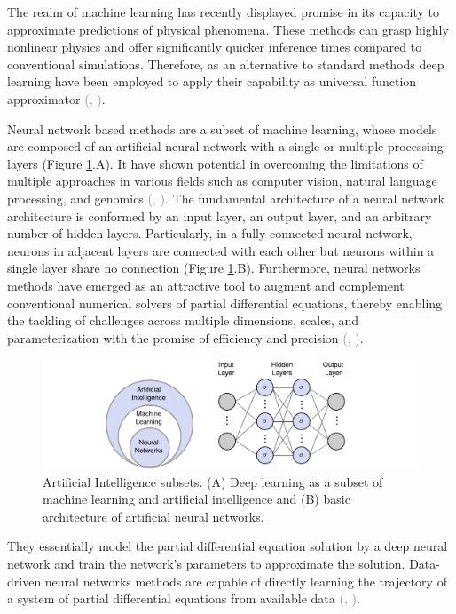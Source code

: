 \documentclass[11pt,twoside]{article}
\renewcommand{\citep}[2][]{\textcolor{gray}{(\citeauthor{#2}, \citeyear[#1]{#2})}}
\begin{document}
The realm of machine learning has recently displayed promise in its capacity to approximate predictions of physical phenomena. These methods can grasp highly nonlinear physics and offer significantly quicker inference times compared to conventional simulations. Therefore, as an alternative to standard methods deep learning have been employed to apply their capability as universal function approximator \citep{hornik_approximation_1991}.

Neural network based methods are a subset of machine learning, whose models are composed of an artificial neural network with a single or multiple processing layers (Figure \ref{deep_learning_subset_architecture}.A). It have shown potential in overcoming the limitations of multiple approaches in various fields such as computer vision, natural language processing, and genomics \citep{lecun_deep_2015,goodfellow_deep_2016}. The fundamental architecture of a neural network architecture is conformed by an input layer, an output layer, and an arbitrary number of hidden layers. Particularly, in a fully connected neural network, neurons in adjacent layers are connected with each other but neurons within a single layer share no connection (Figure \ref{deep_learning_subset_architecture}.B). Furthermore, neural networks methods have emerged as an attractive tool to augment and complement conventional numerical solvers of partial differential equations, thereby enabling the tackling of challenges across multiple dimensions, scales, and parameterization with the promise of efficiency and precision \citep{blechschmidt_three_2021}. 

\begin{figure}
\centering
    \includegraphics[width=1.0\textwidth]{figs/Artificial_Intelligence_subsets.pdf}
    \caption{Artificial Intelligence subsets. (A) Deep learning as a subset of machine learning and artificial intelligence and (B) basic architecture of artificial neural networks.}    
    \label{deep_learning_subset_architecture}
\end{figure}

They essentially model the partial differential equation solution by a deep neural network and train the network’s parameters to approximate the solution. Data-driven neural networks methods are capable of directly learning the trajectory of a system of partial differential equations from available data \citep{li_neural_2020,li_fourier_2021}.
\end{document}
